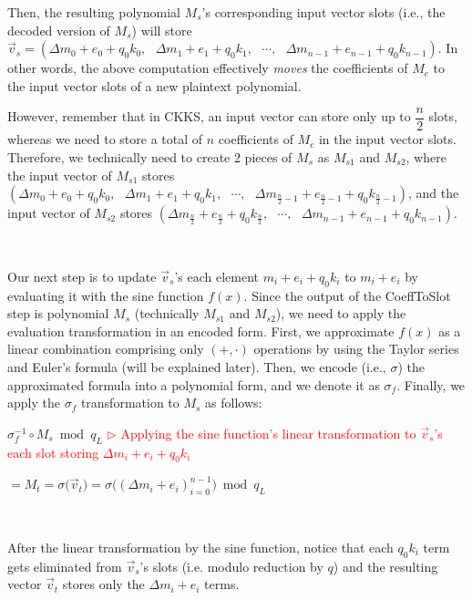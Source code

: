Then, the resulting polynomial $M_s$'s corresponding input vector slots (i.e., the decoded version of $M_s$) will store $\vec{v}_s = (\Delta m_0 + e_0 + q_0k_0, \text{ } \Delta m_1 + e_1 + q_0k_1, \text{ } \cdots, \text{ } \Delta m_{n-1} + e_{n-1} + q_0k_{n-1})$. In other words, the above computation effectively \textit{moves} the coefficients of $M_c$ to the input vector slots of a new plaintext polynomial. 

However, remember that in CKKS, an input vector can store only up to $\dfrac{n}{2}$ slots, whereas we need to store a total of $n$ coefficients of $M_c$ in the input vector slots. Therefore, we technically need to create 2 pieces of $M_s$ as $M_{s1}$ and $M_{s2}$, where the input vector of $M_{s1}$ stores $(\Delta m_0 + e_0 + q_0k_0, \text{ } \Delta m_1 + e_1 + q_0k_1, \text{ } \cdots, \text{ } \Delta m_{\frac{n}{2}-1} + e_{\frac{n}{2}-1} + q_0k_{\frac{n}{2}-1})$, and the input vector of $M_{s2}$ stores $(\Delta m_{\frac{n}{2}} + e_{\frac{n}{2}} + q_0k_{\frac{n}{2}}, \text{ } \cdots, \text{ } \Delta m_{n-1} + e_{n-1} + q_0k_{n-1})$.

$ $

Our next step is to update $\vec{v}_s$'s each element $m_i + e_i + q_0k_i$ to $m_i + e_i$ by evaluating it with the sine function $f(x)$. Since the output of the \textsf{CoeffToSlot} step is polynomial $M_s$ (technically $M_{s1}$ and $M_{s2}$), we need to apply the evaluation transformation in an encoded form. First, we approximate $f(x)$ as a linear combination comprising only $(+, \cdot)$ operations by using the Taylor series and Euler's formula (will be explained later). Then, we encode (i.e., $\sigma$) the approximated formula into a polynomial form, and we denote it as $\sigma_f$. Finally, we apply the $\sigma_f$ transformation to $M_s$ as follows: 

$\sigma^{-1}_f \circ M_s \bmod q_L$  \textcolor{red}{ $\rhd$ Applying the sine function's linear transformation to $\vec{v}_s$'s each slot storing $\Delta m_i + e_i + q_0k_i$}

$= M_t = \sigma\bm{(}\vec{v}_t\bm{)} = \sigma\bm{(}(\Delta m_i + e_i)_{i=0}^{n-1}\bm{)} \bmod q_L$

$ $

After the linear transformation by the sine function, notice that each $q_0 k_i$ term gets eliminated from $\vec{v}_s$'s slots (i.e. modulo reduction by $q$) and the resulting vector $\vec{v}_t$ stores only the $\Delta m_i + e_i$ terms. 


